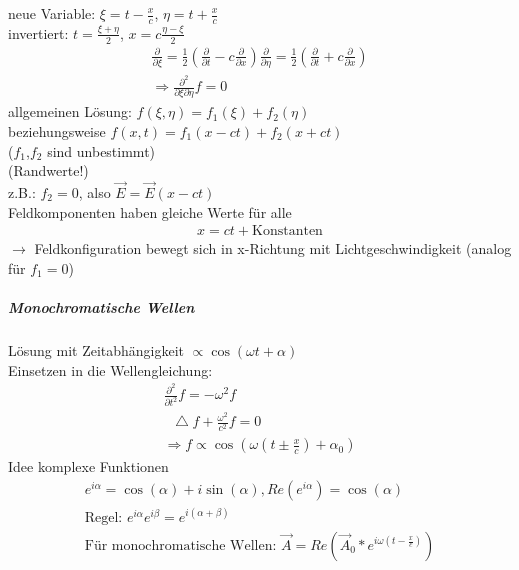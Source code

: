 \documentclass[a4paper]{article}
\newcommand*\laplace{\mathop{}\!\mathbin\bigtriangleup}
\begin{document}
neue Variable: $\xi=t-\frac{x}{c}$, $\eta=t+\frac{x}{c}$\\
invertiert: $t=\frac{\xi+\eta}{2} $, $x=c\frac{\eta-\xi}{2}$
\begin{align}
\frac{\partial}{\partial\xi}=\frac{1}{2}\left(\frac{\partial}{\partial t}-c \frac{\partial}{\partial x} \right)
\frac{\partial}{\partial\eta}=\frac{1}{2}\left(\frac{\partial}{\partial t}+c \frac{\partial}{\partial x} \right)\\
\Rightarrow \frac{\partial^2}{\partial \xi \partial\eta}f=0
\end{align}
allgemeinen Lösung: $f(\xi,\eta)=f_1(\xi)+f_2(\eta)$\\
beziehungsweise $f(x,t)=f_1(x-ct)+f_2(x+ct)$\\
($f_1$,$f_2$ sind unbestimmt)\\
(Randwerte!)\\
z.B.: $f_2=0$, also $\vec{E}=\vec{E}(x-ct)$\\
Feldkomponenten haben gleiche Werte für alle 
\begin{align}
x=ct+\text{Konstanten}
\end{align}
$\rightarrow$ Feldkonfiguration bewegt sich in x-Richtung mit Lichtgeschwindigkeit (analog  für $f_1=0$)

\subparagraph{Monochromatische Wellen}
Lösung mit Zeitabhängigkeit $\propto \cos(\omega t+\alpha)$\\
Einsetzen in die Wellengleichung:
\begin{align}
\frac{\partial^2}{\partial t^2 }f=-\omega^2f\\
\laplace f+ \frac{\omega^2}{c^2}f=0\\
\Rightarrow f\propto \cos(\omega (t\pm\frac{x}{c})+\alpha_0)
\end{align}
Idee komplexe Funktionen
\begin{align}
e^{i\alpha}=\cos(\alpha)+i\sin(\alpha) , Re(e^{i\alpha})=\cos(\alpha)\\
\text{Regel: } e^{i\alpha}e^{i\beta}=e^{i(\alpha+\beta)}\\
\text{Für monochromatische Wellen: } \vec{A}=Re(\vec{A}_0 * e^{i
\omega(t-\frac{x}{c})})
\end{align}
\end{document}
